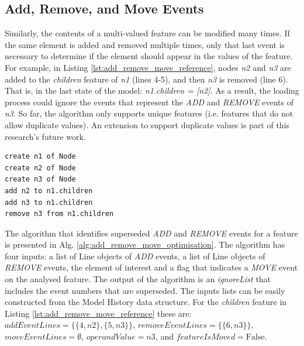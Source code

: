 \documentclass[12pt, a4paper]{report} \usepackage[titletoc]{appendix}
\begin{document}
\subsection{Add, Remove, and Move Events}\label{subsec:add_remove_and_move_operations}
Similarly, the contents of a multi-valued feature can be modified many times. If the same element is added and removed multiple times,  only that last event is necessary to determine if the element should appear in the values of the feature. For example, in Listing \ref{lst:add_remove_move_reference},  nodes \emph{n2} and \emph{n3} are added to the \emph{children} feature of \emph{n1} (lines 4-5), and then \emph{n3} is removed (line 6). That is, in the last state of the model: \emph{n1.children = [n2]}. As a result, the loading process could ignore the events that represent the \emph{ADD} and \emph{REMOVE} events of \emph{n3}. So far, the algorithm only supports unique features (i.e. features that do not allow duplicate values). An extension to support duplicate values is part of this research's future work. 

\begin{lstlisting}[style=eol,caption={Example of CBP representation of attribute \emph{values}'s add and remove operations.},label=lst:add_remove_move_reference]
create n1 of Node
create n2 of Node
create n3 of Node
add n2 to n1.children
add n3 to n1.children
remove n3 from n1.children
\end{lstlisting}

The algorithm that identifies superseded \emph{ADD} and \emph{REMOVE} events for a feature is presented in Alg. \ref{alg:add_remove_move_optimisation}. The algorithm has four inputs: a list of Line objects of \emph{ADD} events, a list of Line objects of \emph{REMOVE} events, the element of interest and a flag that indicates a \emph{MOVE} event on the analysed feature.  The output of the algorithm is an \emph{ignoreList} that includes the event numbers that are superseded. The inputs lists can be easily constructed from the Model History data structure. For the \emph{children} feature in Listing \ref{lst:add_remove_move_reference} these are: $addEventLines=\{\{4,n2\},\{5,n3\}\}$, $removeEventLines=\{\{6,n3\}\}$, $moveEventLines=\emptyset$, $operandValue=n3$, and $featureIsMoved=\mathrm{False}$.
\end{document}
